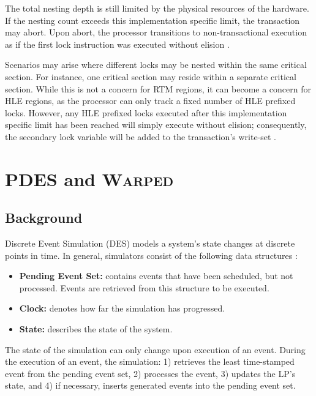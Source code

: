 \documentclass[11pt]{book}
\begin{document}
The total nesting depth is still limited by the physical resources of the hardware.  If
the nesting count exceeds this implementation specific limit, the transaction may abort.
Upon abort, the processor transitions to non-transactional execution as if the first lock
instruction was executed without elision \cite{intel_prog_ref}.

Scenarios may arise where different locks may be nested within the same critical section.
For instance, one critical section may reside within a separate critical section.  While
this is not a concern for RTM regions, it can become a concern for HLE regions, as the
processor can only track a fixed number of HLE prefixed locks.  However, any HLE prefixed
locks executed after this implementation specific limit has been reached will simply
execute without elision; consequently, the secondary lock variable will be added to the
transaction's write-set \cite{intel_prog_ref}.

\chapter{PDES and \textsc{Warped}}

\section{Background}

Discrete Event Simulation (DES) models a system's state changes at discrete points in
time.  In general, simulators consist of the following data structures \cite{fujimoto}:

\begin{itemize}
  \item\textbf{Pending Event Set:} contains events that have been scheduled, but not
    processed.  Events are retrieved from this structure to be executed.
  \item\textbf{Clock:} denotes how far the simulation has progressed.
  \item\textbf{State:} describes the state of the system.
\end{itemize}

\noindent
The state of the simulation can only change upon execution of an event.  During the
execution of an event, the simulation: 1) retrieves the least time-stamped event from the
pending event set, 2) processes the event, 3) updates the LP's state, and 4) if
necessary, inserts generated events into the pending event set.
\end{document}
